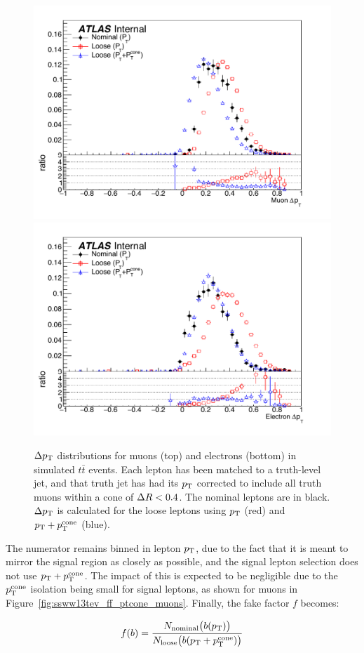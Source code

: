 \begin{figure}[htbp]
  \centering
  \includegraphics[width=.6\textwidth]{figs/ssww_13tev/backgrounds/ff/dpt_muon_ttbar}\\
  \includegraphics[width=.6\textwidth]{figs/ssww_13tev/backgrounds/ff/dpt_elec_ttbar}
  \caption{$\Delta p_{\mathrm{T}}$ distributions for muons (top) and electrons (bottom) in simulated $t\bar{t}$ events.  Each lepton has been matched to a truth-level jet, and that truth jet has had its $p_{\mathrm{T}}$ corrected to include all truth muons within a cone of $\Delta R < 0.4$.  The nominal leptons are in black. $\Delta p_{\mathrm{T}}$ is calculated for the loose leptons using $p_{\mathrm{T}}$ (red) and $p_{\mathrm{T}}+p_{\mathrm{T}}^{\textrm{cone}}$ (blue).}
  \label{fig:ssww13tev_ff_deltapt_ptcone}
\end{figure}

The numerator remains binned in lepton $p_{\mathrm{T}}$, due to the fact that it is meant to mirror the signal region as closely as possible, and the signal lepton selection does not use $p_{\mathrm{T}}+p_{\mathrm{T}}^{\textrm{cone}}$.
The impact of this is expected to be negligible due to the $p_{\mathrm{T}}^{\textrm{cone}}$ isolation being small for signal leptons, as shown for muons in Figure~\ref{fig:ssww13tev_ff_ptcone_muons}.
Finally, the fake factor $f$ becomes:

\begin{equation}
f(b) = \frac{N_{\textrm{nominal}}\big(b(\pt)\big)}{N_{\textrm{loose}}\big(b(\ptptcone)\big)}
\label{eq:ssww13tev_ff_ptcone_binned}
\end{equation}

